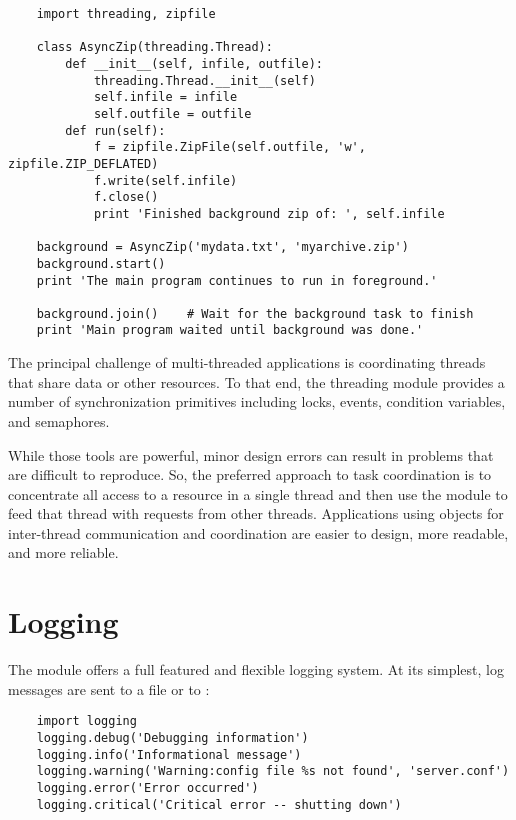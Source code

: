 \documentclass{manual}
\begin{document}
\begin{verbatim}
    import threading, zipfile

    class AsyncZip(threading.Thread):
        def __init__(self, infile, outfile):
            threading.Thread.__init__(self)        
            self.infile = infile
            self.outfile = outfile
        def run(self):
            f = zipfile.ZipFile(self.outfile, 'w', zipfile.ZIP_DEFLATED)
            f.write(self.infile)
            f.close()
            print 'Finished background zip of: ', self.infile

    background = AsyncZip('mydata.txt', 'myarchive.zip')
    background.start()
    print 'The main program continues to run in foreground.'
    
    background.join()    # Wait for the background task to finish
    print 'Main program waited until background was done.'
\end{verbatim}

The principal challenge of multi-threaded applications is coordinating
threads that share data or other resources.  To that end, the threading
module provides a number of synchronization primitives including locks,
events, condition variables, and semaphores.

While those tools are powerful, minor design errors can result in
problems that are difficult to reproduce.  So, the preferred approach
to task coordination is to concentrate all access to a resource
in a single thread and then use the
 module to feed that
thread with requests from other threads.  Applications using
 objects for inter-thread communication and coordination
are easier to design, more readable, and more reliable.


\section{Logging\label{logging}}

The  module offers
a full featured and flexible logging system.  At its simplest, log
messages are sent to a file or to :

\begin{verbatim}
    import logging
    logging.debug('Debugging information')
    logging.info('Informational message')
    logging.warning('Warning:config file %s not found', 'server.conf')
    logging.error('Error occurred')
    logging.critical('Critical error -- shutting down')
\end{verbatim}
\end{document}
